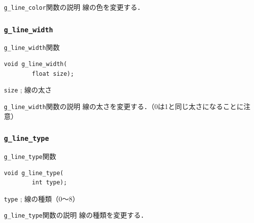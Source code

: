 \documentclass[a4paper,12pt]{jsarticle}%
\begin{document}
\begin{itembox}[l]{\texttt{g\_line\_color}関数の説明}
線の色を変更する．
\end{itembox}

\subsubsection{\texttt{g\_line\_width}}

\begin{itembox}[l]{\texttt{g\_line\_width}関数}
\begin{verbatim}
void g_line_width(
        float size);
\end{verbatim}
\verb|size| ; 線の太さ\\
\end{itembox}

\begin{itembox}[l]{\texttt{g\_line\_width}関数の説明}
線の太さを変更する．（0は1と同じ太さになることに注意）
\end{itembox}

\subsubsection{\texttt{g\_line\_type}}

\begin{itembox}[l]{\texttt{g\_line\_type}関数}
\begin{verbatim}
void g_line_type(
        int type);
\end{verbatim}
\verb|type| ; 線の種類（0〜8）\\
\end{itembox}

\begin{itembox}[l]{\texttt{g\_line\_type}関数の説明}
線の種類を変更する．
\end{itembox}

\begin{figure}[htb]
\end{figure}
\end{document}
